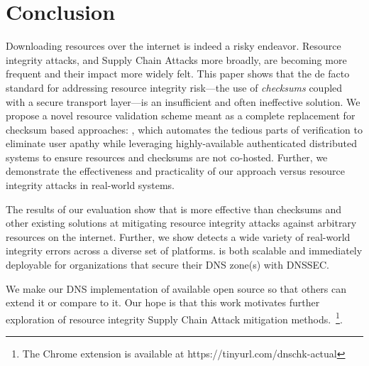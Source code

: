 \section{Conclusion} \label{sec:conclusion}

Downloading resources over the internet is indeed a risky endeavor. Resource
integrity attacks, and Supply Chain Attacks more broadly, are becoming more
frequent and their impact more widely felt. This paper shows that the de facto
standard for addressing resource integrity risk---the use of \emph{checksums}
coupled with a secure transport layer---is an insufficient and often ineffective
solution. We propose a novel resource validation scheme meant as a complete
replacement for checksum based approaches: \SYSTEM{}, which automates the
tedious parts of verification to eliminate user apathy while leveraging
highly-available authenticated distributed systems to ensure resources and
checksums are not co-hosted. Further, we demonstrate the effectiveness and
practicality of our approach versus resource integrity attacks in real-world
systems.

The results of our evaluation show that \SYSTEM{} is more effective than
checksums and other existing solutions at mitigating resource integrity attacks
against arbitrary resources on the internet. Further, we show \SYSTEM{} detects
a wide variety of real-world integrity errors across a diverse set of platforms.
\SYSTEM{} is both scalable and immediately deployable for organizations that
secure their DNS zone(s) with DNSSEC.

We make our DNS implementation of \SYSTEM{} available open source so that others
can extend it or compare to it. Our hope is that this work motivates further
exploration of resource integrity Supply Chain Attack mitigation
methods.~\footnote{The \SYSTEM{} Chrome extension is available at
https://tinyurl.com/dnschk-actual}.
